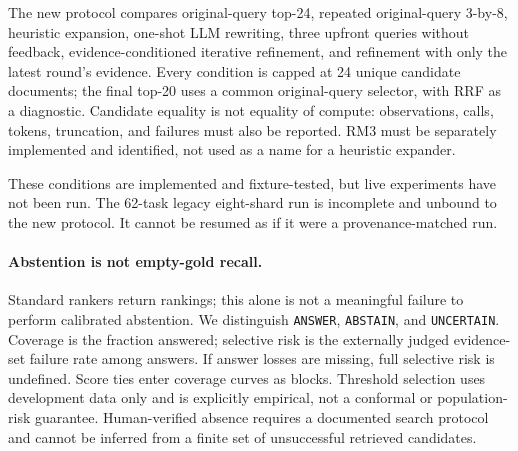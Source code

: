 \documentclass{article}
\begin{document}
The new protocol compares original-query top-24, repeated original-query 3-by-8,
heuristic expansion, one-shot LLM rewriting, three upfront queries without
feedback, evidence-conditioned iterative refinement, and refinement with only
the latest round's evidence. Every condition is capped at 24 unique candidate
documents; the final top-20 uses a common original-query selector, with RRF as a
diagnostic. Candidate equality is not equality of compute: observations, calls,
tokens, truncation, and failures must also be reported. RM3 must be separately
implemented and identified, not used as a name for a heuristic expander.

These conditions are implemented and fixture-tested, but live experiments have
not been run. The 62-task legacy eight-shard run is incomplete and unbound to the
new protocol. It cannot be resumed as if it were a provenance-matched run.

\paragraph{Abstention is not empty-gold recall.}
Standard rankers return rankings; this alone is not a meaningful failure to
perform calibrated abstention. We distinguish \texttt{ANSWER}, \texttt{ABSTAIN},
and \texttt{UNCERTAIN}. Coverage is the fraction answered; selective risk is the
externally judged evidence-set failure rate among answers. If answer losses are
missing, full selective risk is undefined. Score ties enter coverage curves as
blocks. Threshold selection uses development data only and is explicitly
empirical, not a conformal or population-risk guarantee. Human-verified absence
requires a documented search protocol and cannot be inferred from a finite set
of unsuccessful retrieved candidates.
\end{document}
